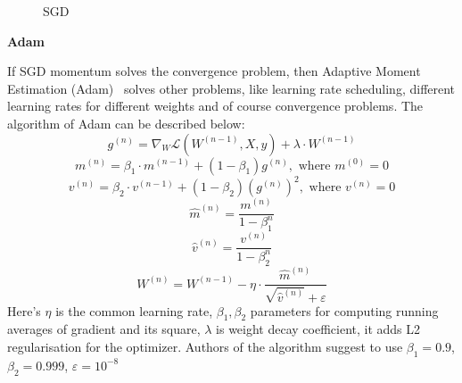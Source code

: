 \begin{figure}[h]
\begin{center}
    \end{center}
    \caption{SGD}\label{SGD}
\end{figure}

\textbf{Adam}

If SGD momentum solves the convergence problem, then Adaptive Moment Estimation (Adam)~\cite{adam} solves other problems, like learning rate scheduling, 
different learning rates for different weights and of course convergence problems. 
The algorithm of Adam can be described below:
\[g^{(n)} = \nabla_{W} \mathcal{L}(W^{(n-1)}, X, y) + \lambda \cdot W^{(n-1)}\]
\[m^{(n)} = \beta_1 \cdot m^{(n-1)} + (1-\beta_1)g^{(n)}, \text{ where } m^{(0)} = 0\]
\[v^{(n)} = \beta_2 \cdot v^{(n-1)} + (1-\beta_2){(g^{(n)})}^2 , \text{ where } v^{(n)} = 0\]
\[\widehat{m}^{(n)} = \frac{m^{(n)}}{1 - \beta_1^n}\]
\[\widehat{v}^{(n)} = \frac{v^{(n)}}{1-\beta_2^n}\]
\[W^{(n)} = W^{(n-1)} - \eta \cdot \frac{\widehat{m}^{(n)}}{\sqrt{\widehat{v}^{(n)}} + \varepsilon} \]
Here's $\eta$ is the common learning rate, $\beta_1, \beta_2$ parameters for computing running averages of gradient and its square, 
$\lambda$ is weight decay coefficient, it adds L2 regularisation for the optimizer. Authors of the algorithm suggest to use $\beta_1 = 0.9$, 
$\beta_2 = 0.999$, $\varepsilon = 10^{-8}$

